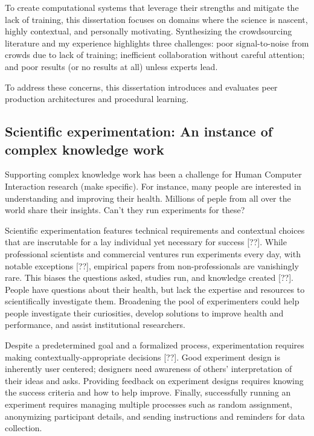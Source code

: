 To create computational systems that leverage their strengths and mitigate the lack of training, this dissertation 
focuses on domains where the science is nascent, highly contextual, and personally motivating.
 Synthesizing the crowdsourcing literature and my experience highlights three challenges: 
poor signal-to-noise from crowds due to lack of training; inefficient collaboration without 
careful attention; and poor results (or no results at all) unless experts lead. 

To address  these concerns,  this dissertation introduces and evaluates peer production architectures 
and procedural learning.

\subsection{Scientific experimentation: An instance of complex knowledge work}
Supporting complex knowledge work has been a challenge for Human Computer Interaction
 research (make specific). For instance, many people are interested in understanding and 
improving their health. Millions of peple from all over the world share their insights. 
Can't they run experiments for these?

Scientific experimentation features technical requirements and contextual choices 
that are inscrutable for a lay individual yet necessary for success [??]. While 
professional scientists and commercial ventures run experiments every day, with 
notable exceptions [??], empirical papers from non-professionals are 
vanishingly rare. This biases the questions asked, studies run, and knowledge 
created [??]. People have questions about their health, but lack the expertise 
and resources to scientifically investigate them. Broadening the pool of 
experimenters could help people investigate their curiosities, develop solutions 
to improve health and performance, and assist institutional researchers.

Despite a predetermined goal and a formalized process,
experimentation requires making contextually-appropriate
decisions [??]. Good experiment design is inherently user
centered; designers need awareness of others’ interpretation
of their ideas and asks. Providing feedback on experiment
designs requires knowing the success criteria and how to
help improve. Finally, successfully running an experiment
requires managing multiple processes such as random
assignment, anonymizing participant details, and sending
instructions and reminders for data collection.

